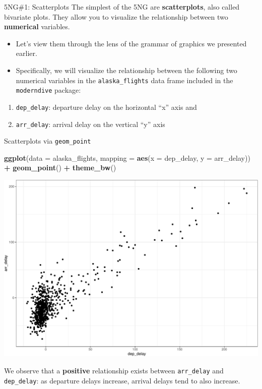 \documentclass[
  ignorenonframetext,
]{beamer}
\newenvironment{Shaded}{\begin{snugshade}}{\end{snugshade}}
\newcommand{\AttributeTok}[1]{\textcolor[rgb]{0.13,0.29,0.53}{#1}}
\newcommand{\FunctionTok}[1]{\textcolor[rgb]{0.13,0.29,0.53}{\textbf{#1}}}
\newcommand{\NormalTok}[1]{#1}
\newcommand{\SpecialCharTok}[1]{\textcolor[rgb]{0.81,0.36,0.00}{\textbf{#1}}}
\begin{document}
\begin{frame}[fragile]{5NG\#1: Scatterplots}
\protect\hypertarget{ng1-scatterplots}{}
The simplest of the 5NG are \textbf{scatterplots}, also called bivariate
plots. They allow you to visualize the relationship between two
\textbf{numerical} variables.

\begin{itemize}
\item
  Let's view them through the lens of the grammar of graphics we
  presented earlier.
\item
  Specifically, we will visualize the relationship between the following
  two numerical variables in the \texttt{alaska\_flights} data frame
  included in the \texttt{moderndive} package:
\end{itemize}

\begin{enumerate}
\item
  \texttt{dep\_delay}: departure delay on the horizontal ``x'' axis and
\item
  \texttt{arr\_delay}: arrival delay on the vertical ``y'' axis
\end{enumerate}
\end{frame}

\begin{frame}[fragile]{Scatterplots via \texttt{geom\_point}}
\protect\hypertarget{scatterplots-via-geom_point}{}
\tiny

\begin{Shaded}
\begin{Highlighting}[]
\FunctionTok{ggplot}\NormalTok{(}\AttributeTok{data =}\NormalTok{ alaska\_flights, }\AttributeTok{mapping =} \FunctionTok{aes}\NormalTok{(}\AttributeTok{x =}\NormalTok{ dep\_delay, }\AttributeTok{y =}\NormalTok{ arr\_delay)) }\SpecialCharTok{+} 
  \FunctionTok{geom\_point}\NormalTok{() }\SpecialCharTok{+} 
  \FunctionTok{theme\_bw}\NormalTok{()}
\end{Highlighting}
\end{Shaded}

\begin{center}\includegraphics[width=0.7\linewidth,height=0.5\textheight]{Week2_Lect_files/figure-beamer/unnamed-chunk-19-1} \end{center}
\normalsize

We observe that a \textbf{positive} relationship exists between
\texttt{arr\_delay} and \texttt{dep\_delay}: as departure delays
increase, arrival delays tend to also increase.
\end{frame}
\end{document}
